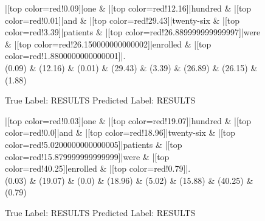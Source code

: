 \documentclass[a4paper, landscape]{article}
\begin{document}
\begin{figure}
\begin{center}
\begin{dependency}
\begin{deptext}
|[top color=red!0.09]|one \& |[top color=red!12.16]|hundred \& |[top color=red!0.01]|and \& |[top color=red!29.43]|twenty-six \& |[top color=red!3.39]|patients \& |[top color=red!26.889999999999997]|were \& |[top color=red!26.150000000000002]|enrolled \& |[top color=red!1.8800000000000001]|.\\
(0.09) \& (12.16) \& (0.01) \& (29.43) \& (3.39) \& (26.89) \& (26.15) \& (1.88)\\
\end{deptext}
\end{dependency}
\end{center}
\caption{True Label: RESULTS Predicted Label: RESULTS}
\end{figure}
\clearpage
\begin{figure}
\begin{center}
\begin{dependency}
\begin{deptext}
|[top color=red!0.03]|one \& |[top color=red!19.07]|hundred \& |[top color=red!0.0]|and \& |[top color=red!18.96]|twenty-six \& |[top color=red!5.0200000000000005]|patients \& |[top color=red!15.879999999999999]|were \& |[top color=red!40.25]|enrolled \& |[top color=red!0.79]|.\\
(0.03) \& (19.07) \& (0.0) \& (18.96) \& (5.02) \& (15.88) \& (40.25) \& (0.79)\\
\end{deptext}
\end{dependency}
\end{center}
\caption{True Label: RESULTS Predicted Label: RESULTS}
\end{figure}
\clearpage
\end{document}

